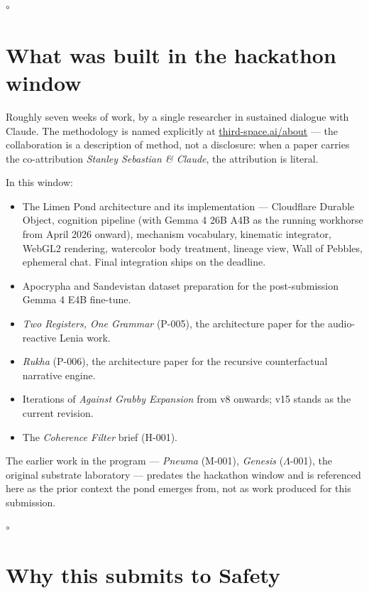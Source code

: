 \documentclass[11pt]{article}
\newcommand{\pondrule}{%
  \begin{center}\vspace{0.55em}%
  {\scriptsize $\circ$}\vspace{0.55em}\end{center}}
\begin{document}
\pondrule

\section{What was built in the hackathon window}

Roughly seven weeks of work, by a single researcher in sustained
dialogue with Claude. The methodology is named explicitly at
\href{https://third-space.ai/about}{third-space.ai/about} --- the
collaboration is a description of method, not a disclosure: when a
paper carries the co-attribution \emph{Stanley Sebastian \& Claude},
the attribution is literal.

In this window:

\begin{itemize}
\item The Limen Pond architecture and its implementation --- Cloudflare
  Durable Object, cognition pipeline (with Gemma 4 26B A4B as the
  running workhorse from April 2026 onward), mechanism vocabulary,
  kinematic integrator, WebGL2 rendering, watercolor body treatment,
  lineage view, Wall of Pebbles, ephemeral chat. Final integration
  ships on the deadline.
\item Apocrypha and Sandevistan dataset preparation for the
  post-submission Gemma 4 E4B fine-tune.
\item \emph{Two Registers, One Grammar} (P-005), the architecture paper
  for the audio-reactive Lenia work.
\item \emph{Rukha} (P-006), the architecture paper for the recursive
  counterfactual narrative engine.
\item Iterations of \emph{Against Grabby Expansion} from v8 onwards;
  v15 stands as the current revision.
\item The \emph{Coherence Filter} brief (H-001).
\end{itemize}

The earlier work in the program --- \emph{Pneuma} (M-001),
\emph{Genesis} ($\Lambda$-001), the original substrate laboratory ---
predates the hackathon window and is referenced here as the prior
context the pond emerges from, not as work produced for this submission.

\pondrule

\section{Why this submits to Safety}
\end{document}
